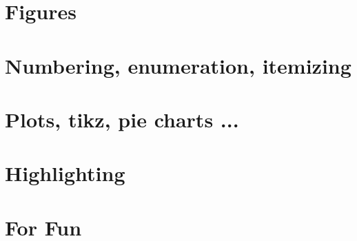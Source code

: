 \documentclass[14pt]{extreport}
\begin{document}
\chapter{Figures}


\chapter{Numbering, enumeration, itemizing}


\chapter{Plots, tikz, pie charts ...}



\chapter{Highlighting}


\chapter{For Fun}

\end{document}
